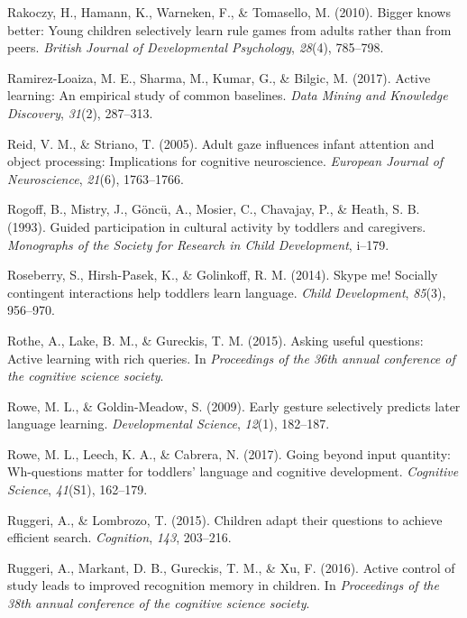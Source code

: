 \documentclass[english,floatsintext,man]{apa6}
\theoremstyle{definition}
\theoremstyle{definition}
\theoremstyle{definition}
\theoremstyle{remark}
\begin{document}
\hypertarget{ref-rakoczy2010bigger}{}
Rakoczy, H., Hamann, K., Warneken, F., \& Tomasello, M. (2010). Bigger
knows better: Young children selectively learn rule games from adults
rather than from peers. \emph{British Journal of Developmental
Psychology}, \emph{28}(4), 785--798.

\hypertarget{ref-ramirez2017active}{}
Ramirez-Loaiza, M. E., Sharma, M., Kumar, G., \& Bilgic, M. (2017).
Active learning: An empirical study of common baselines. \emph{Data
Mining and Knowledge Discovery}, \emph{31}(2), 287--313.

\hypertarget{ref-reid2005adult}{}
Reid, V. M., \& Striano, T. (2005). Adult gaze influences infant
attention and object processing: Implications for cognitive
neuroscience. \emph{European Journal of Neuroscience}, \emph{21}(6),
1763--1766.

\hypertarget{ref-rogoff1993guided}{}
Rogoff, B., Mistry, J., Göncü, A., Mosier, C., Chavajay, P., \& Heath,
S. B. (1993). Guided participation in cultural activity by toddlers and
caregivers. \emph{Monographs of the Society for Research in Child
Development}, i--179.

\hypertarget{ref-roseberry2014skype}{}
Roseberry, S., Hirsh-Pasek, K., \& Golinkoff, R. M. (2014). Skype me!
Socially contingent interactions help toddlers learn language.
\emph{Child Development}, \emph{85}(3), 956--970.

\hypertarget{ref-rothe2015asking}{}
Rothe, A., Lake, B. M., \& Gureckis, T. M. (2015). Asking useful
questions: Active learning with rich queries. In \emph{Proceedings of
the 36th annual conference of the cognitive science society}.

\hypertarget{ref-rowe2009early}{}
Rowe, M. L., \& Goldin-Meadow, S. (2009). Early gesture selectively
predicts later language learning. \emph{Developmental Science},
\emph{12}(1), 182--187.

\hypertarget{ref-rowe2017going}{}
Rowe, M. L., Leech, K. A., \& Cabrera, N. (2017). Going beyond input
quantity: Wh-questions matter for toddlers' language and cognitive
development. \emph{Cognitive Science}, \emph{41}(S1), 162--179.

\hypertarget{ref-ruggeri2015children}{}
Ruggeri, A., \& Lombrozo, T. (2015). Children adapt their questions to
achieve efficient search. \emph{Cognition}, \emph{143}, 203--216.

\hypertarget{ref-ruggeri2016active}{}
Ruggeri, A., Markant, D. B., Gureckis, T. M., \& Xu, F. (2016). Active
control of study leads to improved recognition memory in children. In
\emph{Proceedings of the 38th annual conference of the cognitive science
society}.
\end{document}
